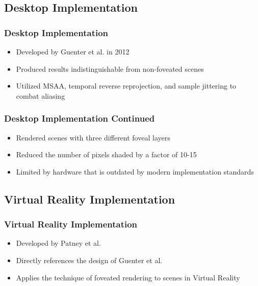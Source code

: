 \documentclass{beamer}
\newcommand{\linespace}{\vskip 0.25cm}
\begin{document}
\subsection{Desktop Implementation}
\begin{frame}
  \frametitle{Desktop Implementation}
	\begin{itemize}
		\item Developed by Guenter et al. in 2012
		\linespace
		\item Produced results indistinguishable from non-foveated scenes
		\linespace
		\item Utilized MSAA, temporal reverse reprojection, and sample jittering to combat aliasing
	\end{itemize}
\end{frame}

\begin{frame}
  \frametitle{Desktop Implementation Continued}
	\begin{itemize}
		\item Rendered scenes with three different foveal layers
		\linespace
		\item Reduced the number of pixels shaded by a factor of 10-15
		\linespace
		\item Limited by hardware that is outdated by modern implementation standards
	\end{itemize}
\end{frame}



\subsection{Virtual Reality Implementation}

\begin{frame}
  \frametitle{Virtual Reality Implementation}
	\begin{itemize}
		\item Developed by Patney et al.
	\linespace
		\item Directly references the design of Guenter et al.
	\linespace
		\item Applies the technique of foveated rendering to scenes in Virtual Reality
	\end{itemize}
\end{frame}
\end{document}
